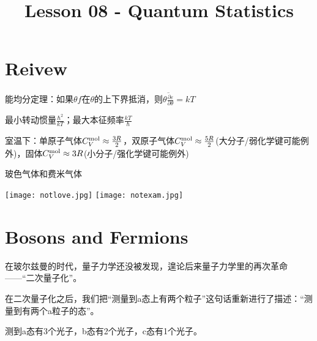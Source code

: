\documentclass[CJK]{beamer}
\title{Lesson 08 - Quantum Statistics}
\author{}
\date{}
\begin{document}

\section{Reivew}

\begin{frame}
\bch
{\large
\bitem
\item{能均分定理：如果$\theta f$在$\theta$的上下界抵消，则$\overline{\theta\frac{\partial\varepsilon}{\partial\theta}}=kT$}
\item{最小转动惯量$\frac{\hbar^2}{kT}$；最大本征频率$\frac{kT}{\hbar}$}
\item{室温下：单原子气体$C_V^{\rm mol} \approx \frac{3R}{2}$，双原子气体$C_V^{\rm mol}\approx\frac{5R}{2}$(大分子/弱化学键可能例外)，固体$C_V^{\rm mol} \approx 3R$(小分子/强化学键可能例外)}
  \eitem
  }
\ech
\end{frame}


\begin{frame}
\bch
\bitem
\item{玻色气体和费米气体}
\eitem
\ech
\end{frame}


\begin{frame}
\bch
\texttt{[image: notlove.jpg]} \hspace{0.25in} \texttt{[image: notexam.jpg]}
\ech
\end{frame}


\section{Bosons and Fermions}


\begin{frame}
\bch
{\large
在玻尔兹曼的时代，量子力学还没被发现，遑论后来量子力学里的再次革命——“二次量子化”。

\skiplines

在二次量子化之后，我们把“测量到a态上有两个粒子”这句话重新进行了描述：“测量到有两个a粒子的态”。
}
\skipline

\ech
\end{frame}


\begin{frame}
\bch
{}

测到a态有3个光子，b态有2个光子，c态有1个光子。
\ech
\end{frame}
\end{document}
